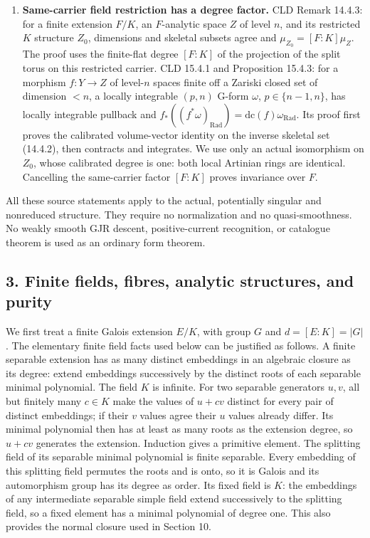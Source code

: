\documentclass[11pt]{article}
\begin{document}
\begin{enumerate}
  pullback of a continuous current.
\item
  \textbf{Same-carrier field restriction has a degree factor.} CLD
  Remark 14.4.3: for a finite extension \(F/K\), an \(F\)-analytic space
  \(Z\) of level \(n\), and its restricted \(K\) structure \(Z_0\),
  dimensions and skeletal subsets agree and \(\mu_{Z_0}=[F:K]\mu_Z\).
  The proof uses the finite-flat degree \([F:K]\) of the projection of
  the split torus on this restricted carrier. CLD 15.4.1 and Proposition
  15.4.3: for a morphism \(f:Y\to Z\) of level-\(n\) spaces finite off a
  Zariski closed set of dimension \(<n\), a locally integrable \((p,n)\)
  G-form \(\omega\), \(p\in\{n-1,n\}\), has locally integrable pullback
  and
  \(f_*((f^*\omega)_{\mathrm{Rad}})=\mathrm{dc}(f)\omega_{\mathrm{Rad}}\).
  Its proof first proves the calibrated volume-vector identity on the
  inverse skeletal set (14.4.2), then contracts and integrates. We use
  only an actual isomorphism on \(Z_0\), whose calibrated degree is one:
  both local Artinian rings are identical. Cancelling the same-carrier
  factor \([F:K]\) proves invariance over \(F\).
\end{enumerate}

All these source statements apply to the actual, potentially singular
and nonreduced structure. They require no normalization and no
quasi-smoothness. No weakly smooth GJR descent, positive-current
recognition, or catalogue theorem is used as an ordinary form theorem.

\subsection{3. Finite fields, fibres, analytic structures, and
purity}\label{finite-fields-fibres-analytic-structures-and-purity}

We first treat a finite Galois extension \(E/K\), with group \(G\) and
\(d=[E:K]=|G|\). The elementary finite field facts used below can be
justified as follows. A finite separable extension has as many distinct
embeddings in an algebraic closure as its degree: extend embeddings
successively by the distinct roots of each separable minimal polynomial.
The field \(K\) is infinite. For two separable generators \(u,v\), all
but finitely many \(c\in K\) make the values of \(u+cv\) distinct for
every pair of distinct embeddings; if their \(v\) values agree their
\(u\) values already differ. Its minimal polynomial then has at least as
many roots as the extension degree, so \(u+cv\) generates the extension.
Induction gives a primitive element. The splitting field of its
separable minimal polynomial is finite separable. Every embedding of
this splitting field permutes the roots and is onto, so it is Galois and
its automorphism group has its degree as order. Its fixed field is
\(K\): the embeddings of any intermediate separable simple field extend
successively to the splitting field, so a fixed element has a minimal
polynomial of degree one. This also provides the normal closure used in
Section 10.
\end{document}

